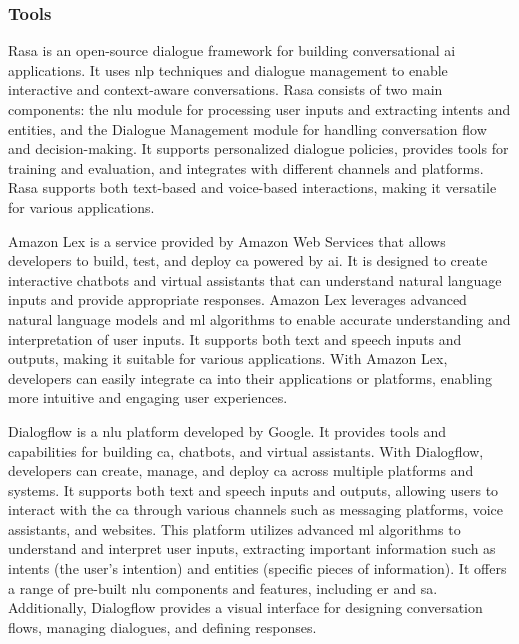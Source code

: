 \documentclass[a4paper,fleqn]{cas-dc}
\begin{document}
\subsubsection{Tools}

Rasa \cite{rasa} is an open-source dialogue framework for building conversational \gls{ai} applications. It uses \gls{nlp} techniques and dialogue management to enable interactive and context-aware conversations. Rasa consists of two main components: the \gls{nlu} module for processing user inputs and extracting intents and entities, and the Dialogue Management module for handling conversation flow and decision-making. It supports personalized dialogue policies, provides tools for training and evaluation, and integrates with different channels and platforms. Rasa supports both text-based and voice-based interactions, making it versatile for various applications.

Amazon Lex \cite{aws} is a service provided by Amazon Web Services that allows developers to build, test, and deploy \gls{ca} powered by \gls{ai}. It is designed to create interactive chatbots and virtual assistants that can understand natural language inputs and provide appropriate responses. Amazon Lex leverages advanced natural language models and \gls{ml} algorithms to enable accurate understanding and interpretation of user inputs. It supports both text and speech inputs and outputs, making it suitable for various applications. With Amazon Lex, developers can easily integrate \gls{ca} into their applications or platforms, enabling more intuitive and engaging user experiences.

Dialogflow \cite{dialogflow} is a \gls{nlu} platform developed by Google. It provides tools and capabilities for building \gls{ca}, chatbots, and virtual assistants. With Dialogflow, developers can create, manage, and deploy \gls{ca} across multiple platforms and systems. It supports both text and speech inputs and outputs, allowing users to interact with the \gls{ca} through various channels such as messaging platforms, voice assistants, and websites. This platform utilizes advanced \gls{ml} algorithms to understand and interpret user inputs, extracting important information such as intents (the user's intention) and entities (specific pieces of information). It offers a range of pre-built \gls{nlu} components and features, including \gls{er} and \gls{sa}. Additionally, Dialogflow provides a visual interface for designing conversation flows, managing dialogues, and defining responses.
\end{document}
